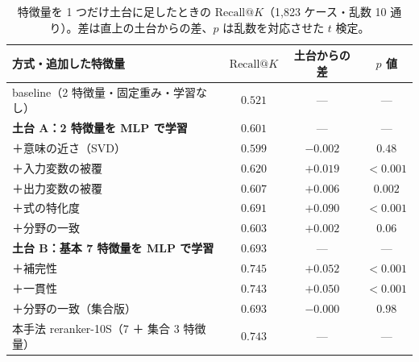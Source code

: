 \documentclass[a4j,dvipdfmx,11pt]{jresume}
\makeatletter
\newcommand{\rk}{\textrm{Recall@}K}
\makeatother
\begin{document}
\begin{table}[h]\centering
\small
\caption{特徴量を 1 つだけ土台に足したときの $\rk$（1{,}823 ケース・乱数 10 通り）。差は直上の土台からの差、$p$ は乱数を対応させた $t$ 検定。}
\label{tab:ablation}
\begin{tabular}{lccc}
\toprule
方式・追加した特徴量 & $\rk$ & 土台からの差 & $p$ 値 \\
\midrule
baseline（2 特徴量・固定重み・学習なし） & $0.521$ & — & — \\
\midrule
\textbf{土台 A：2 特徴量を MLP で学習} & $0.601$ & — & — \\
\quad ＋意味の近さ（SVD） & $0.599$ & $-0.002$ & $0.48$ \\
\quad ＋入力変数の被覆 & $0.620$ & $+0.019$ & $<0.001$ \\
\quad ＋出力変数の被覆 & $0.607$ & $+0.006$ & $0.002$ \\
\quad ＋式の特化度 & $\mathbf{0.691}$ & $\mathbf{+0.090}$ & $<0.001$ \\
\quad ＋分野の一致 & $0.603$ & $+0.002$ & $0.06$ \\
\midrule
\textbf{土台 B：基本 7 特徴量を MLP で学習} & $0.693$ & — & — \\
\quad ＋補完性 & $0.745$ & $+0.052$ & $<0.001$ \\
\quad ＋一貫性 & $0.743$ & $+0.050$ & $<0.001$ \\
\quad ＋分野の一致（集合版） & $0.693$ & $-0.000$ & $0.98$ \\
\midrule
本手法 reranker-10S（7 ＋ 集合 3 特徴量） & $0.743$ & — & — \\
\bottomrule
\end{tabular}
\end{table}
\end{document}
